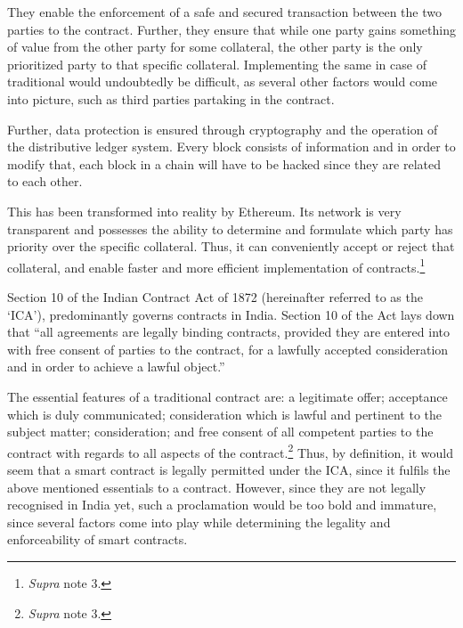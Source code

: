 \begin{multicols}{2}

\noi
They enable the enforcement of a safe and secured transaction between the two parties to the
contract. Further, they ensure that while one party gains something of value from the other
party for some collateral, the other party is the only prioritized party to that specific collateral. Implementing the same in case of traditional would undoubtedly be difficult, as
several other factors would come into picture, such as third parties partaking in the contract. 

\noi
Further, data protection is ensured through cryptography and the operation of the distributive
ledger system. Every block consists of information and in order to modify that, each block in
a chain will have to be hacked since they are related to each other.

\newpage

\noi
This has been transformed into reality by Ethereum. Its network is very transparent and
possesses the ability to determine and formulate which party has priority over the specific
collateral. Thus, it can conveniently accept or reject that collateral, and enable faster and
more efficient implementation of contracts.\footnote{\textit{Supra} note 3.}


\noi
Section 10 of the Indian Contract Act of 1872 (hereinafter referred to as the ‘ICA’),
predominantly governs contracts in India. Section 10 of the Act lays down that “all
agreements are legally binding contracts, provided they are entered into with free consent of
parties to the contract, for a lawfully accepted consideration and in order to achieve a lawful
object.”

\noi
The essential features of a traditional contract are: a legitimate offer; acceptance which is
duly communicated; consideration which is lawful and pertinent to the subject matter;
consideration; and free consent of all competent parties to the contract with regards to all
aspects of the contract.\footnote{\textit{Supra} note 3.} Thus, by definition, it would seem that a smart contract is legally
permitted under the ICA, since it fulfils the above mentioned essentials to a contract.
However, since they are not legally recognised in India yet, such a proclamation would be too
bold and immature, since several factors come into play while determining the legality and
enforceability of smart contracts. 


\end{multicols}
